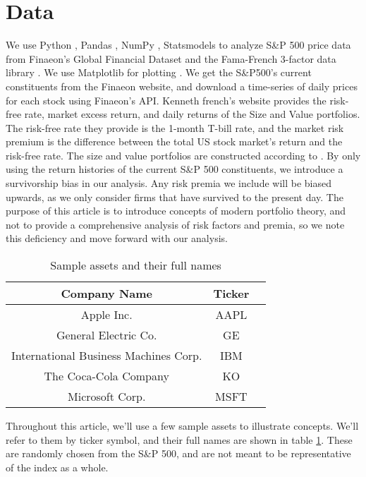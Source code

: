 \section{Data}
\label{sec:data}
We use Python \citep{python3}, Pandas \citep{reback2020pandas}, NumPy \citep{harris2020array}, Statsmodels \citep{seabold2010statsmodels} to analyze S\&P 500 price data from Finaeon's Global Financial Dataset \citep{finaeon} and the Fama-French 3-factor data library \citep{french_website}. 
We use Matplotlib for plotting \citep{Hunter2007}.
We get the S\&P500's current constituents from the Finaeon website, and download a time-series of daily prices for each stock using Finaeon's API. 
Kenneth french's website \citep{french_website} provides the risk-free rate, market excess return, and daily returns of the Size and Value portfolios. 
The risk-free rate they provide is the 1-month T-bill rate, and the market risk premium is the difference between the total US stock market's return and the risk-free rate.
The size and value portfolios are constructed according to \citet{fama_french_1993}.
By only using the return histories of the current S\&P 500 constituents, we introduce a survivorship bias in our analysis. Any risk premia we include will be biased upwards, as we only consider firms that have survived to the present day.
The purpose of this article is to introduce concepts of modern portfolio theory, and not to provide a comprehensive analysis of risk factors and premia, so we
note this deficiency and move forward with our analysis.

\begin{table}
    \centering
    \begin{tabular}{|c|c|c|}
        \hline
        \textbf{Company Name} & \textbf{Ticker}\\
        \hline
        Apple Inc. & AAPL\\
        General Electric Co. & GE\\
        International Business Machines Corp. & IBM\\
        The Coca-Cola Company & KO\\
        Microsoft Corp. & MSFT\\
        \hline
    \end{tabular}
    \caption{Sample assets and their full names}
    \label{tab:sample_assets_w_names}
\end{table}

Throughout this article, we'll use a few sample assets to illustrate concepts. We'll refer to them by ticker symbol, and their full names are shown in table \ref{tab:sample_assets_w_names}.
These are randomly chosen from the S\&P 500, and are not meant to be representative of the index as a whole.

